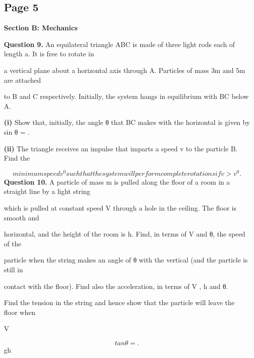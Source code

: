 \documentclass[12pt]{article}
\begin{document}
\subsection*{Page 5}
\begin{flushleft}
\bigskip\textbf{Section B: Mechanics}\par
\bigskip\textbf{Question 9.} An equilateral triangle ABC is made of three light rods each of length a. It is free to rotate in\par
a vertical plane about a horizontal axis through A. Particles of mass 3m and 5m are attached\par
to B and C respectively. Initially, the system hangs in equilibrium with BC below A.\par
\textbf{(i)} Show that, initially, the angle θ that BC makes with the horizontal is given by sin θ = .\par
\textbf{(ii)} The triangle receives an impulse that imparts a speed v to the particle B. Find the\par
\[minimum speed v^0 such that the system will perform complete rotations if v > v^0.\]
\bigskip\textbf{Question 10.} A particle of mass m is pulled along the floor of a room in a straight line by a light string\par
which is pulled at constant speed V through a hole in the ceiling. The floor is smooth and\par
horizontal, and the height of the room is h. Find, in terms of V and θ, the speed of the\par
particle when the string makes an angle of θ with the vertical (and the particle is still in\par
contact with the floor). Find also the acceleration, in terms of V , h and θ.\par
Find the tension in the string and hence show that the particle will leave the floor when\par
V\par
\[tan θ = .\]
gh\par
\end{flushleft}
\end{document}
